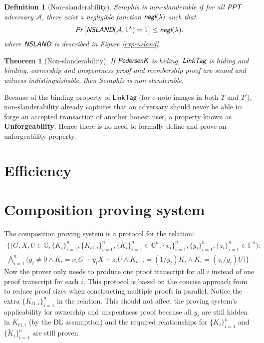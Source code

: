 \documentclass{article}
\theoremstyle{plain}
\newtheorem{definition}{Definition}[section]
\newtheorem{theorem}{Theorem}[section]
\theoremstyle{remark}
\begin{document}
\begin{definition}[Non-slanderability]
Seraphis is non-slanderable if for all $\emph{\textsf{PPT}}$ adversary $\mathcal{A}$, there exist a negligible function $\emph{\textsf{negl}}(\lambda)$ such that
\begin{align*}
\emph{\textsf{Pr}}
\left[
\emph{\textsf{NSLAND}}(\mathcal{A}, 1^{\lambda})=1
\right]
\le \emph{\textsf{negl}}(\lambda).
\end{align*}
where $\emph{\textsf{NSLAND}}$ is described in Figure \ref{exp-nsland}.
\end{definition}
\begin{theorem}[Non-slanderability]\label{thm-nsland}
If $\emph{\textsf{PedersenK}}$ is hiding, $\emph{\textsf{LinkTag}}$ is hiding and binding, ownership and unspentness proof and membership proof are sound and witness indistinguishable, then Seraphis is non-slanderable.
\end{theorem}
Because of the binding property of $\textsf{LinkTag}$ (for e-note images in both $T$ and $T'$), non-slanderability already captures that an adversary should never be able to forge an accepted transaction of another honest user, a property known as \textbf{Unforgeability}. Hence there is no need to formally define and prove an unforgeability property.


\section{Efficiency}




\appendix

\section{Composition proving system}\label{comp-prov}
The composition proving system is a protocol for the relation:
\begin{multline*}
\Big\{\big(G, X, U\in\mathbb{G}, \{K_i\}_{i=1}^n, \{K_{t1,i}\}_{i=1}^n, \{\tilde{K}_i\}_{i=1}^n \in\mathbb{G}^n; \{x_i\}_{i=1}^n, \{y_i\}_{i=1}^n, \{z_i\}_{i=1}^n \in\mathbb{F}^n\big): \\ \bigwedge_{i=1}^n{\big(y_i \ne 0 \wedge K_i = x_i G + y_i X + z_i U \wedge K_{t1,i} = (1/y_i)K_i \wedge \tilde{K}_i = (z_i/y_i)U\big)} \Big\}
\end{multline*}
Now the prover only needs to produce one proof transcript for all $i$ instead of one proof transcript for each $i$. This protocol is based on the concise approach from \cite{clsag} to reduce proof sizes when constructing multiple proofs in parallel. Notice the extra $\{K_{t1,i}\}_{i=1}^n$ in the relation. This should not affect the proving system's applicability for ownership and unspentness proof because all $y_i$ are still hidden in $K_{t1,i}$ (by the DL assumption) and the required relationships for $\{K_i\}_{i=1}^n$ and $\{\tilde{K}_i\}_{i=1}^n$ are still proven.
\end{document}
